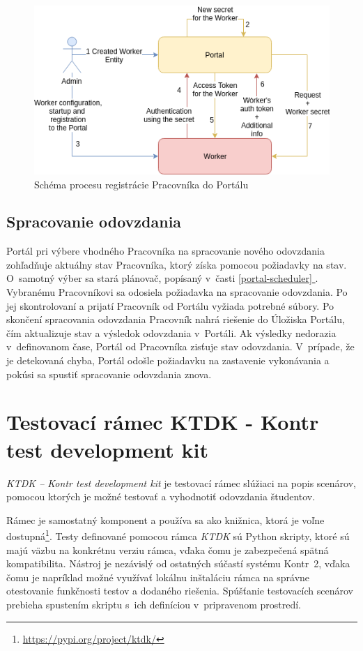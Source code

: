 \documentclass[
  digital, %
  oneside, %
  table,   %
  lof,     %
  lot,   %
]{fithesis3}
\newcommand*{\fullref}[1]{\hyperref[{#1}]{\ref*{#1} \nameref*{#1}}}
\begin{document}
\begin{figure}[!ht]
  \begin{center}
    \includegraphics[width=\textwidth]{imgs/worker-reg.png}
  \end{center}
    \caption{Schéma procesu registrácie Pracovníka do Portálu}
    \label{fig:worker-reg}
\end{figure}

\subsection{Spracovanie odovzdania}
Portál pri výbere vhodného Pracovníka na spracovanie nového odovzdania zohľadňuje aktuálny stav Pracovníka, ktorý získa pomocou požiadavky na stav. O~samotný výber sa stará plánovač, popísaný v~časti \fullref{portal-scheduler}. Vybranému Pracovníkovi sa odosiela požiadavka na spracovanie odovzdania. Po jej skontrolovaní a prijatí Pracovník od Portálu vyžiada potrebné súbory. Po skončení spracovania odovzdania Pracovník nahrá riešenie do Úložiska Portálu, čím aktualizuje stav a výsledok odovzdania v~Portáli. Ak výsledky nedorazia v~definovanom čase, Portál od Pracovníka zisťuje stav odovzdania. V~prípade, že je detekovaná chyba, Portál odošle požiadavku na zastavenie vykonávania a pokúsi sa spustiť spracovanie odovzdania znova. 

\section{Testovací rámec KTDK - Kontr test development kit}

\emph{KTDK -- Kontr test development kit} je testovací rámec slúžiaci na popis scenárov, pomocou ktorých je možné testovať a vyhodnotiť odovzdania študentov.

Rámec je samostatný komponent a používa sa ako knižnica, ktorá je voľne dostupná\footnote{\url{https://pypi.org/project/ktdk/}}. Testy definované pomocou rámca \emph{KTDK} sú Python skripty, ktoré sú majú väzbu na konkrétnu verziu rámca, vďaka čomu je zabezpečená spätná kompatibilita. Nástroj je nezávislý od ostatných súčastí systému Kontr~2, vďaka čomu je napríklad možné využívať lokálnu inštaláciu rámca na správne otestovanie funkčnosti testov a dodaného riešenia. Spúšťanie testovacích scenárov prebieha spustením skriptu s~ich definíciou v~pripravenom prostredí.
\end{document}
